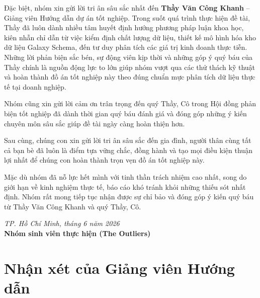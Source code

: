 \documentclass[12pt, a4paper]{report}
\begin{document}
Đặc biệt, nhóm xin gửi lời tri ân sâu sắc nhất đến \textbf{Thầy Văn Công Khanh} -- Giảng viên Hướng dẫn dự án tốt nghiệp. Trong suốt quá trình thực hiện đề tài, Thầy đã luôn dành nhiều tâm huyết định hướng phương pháp luận khoa học, kiên nhẫn chỉ dẫn từ việc kiểm định chất lượng dữ liệu, thiết kế mô hình hóa kho dữ liệu Galaxy Schema, đến tư duy phân tích các giá trị kinh doanh thực tiễn. Những lời phản biện sắc bén, sự động viên kịp thời và những góp ý quý báu của Thầy chính là nguồn động lực to lớn giúp nhóm vượt qua các thử thách kỹ thuật và hoàn thành đồ án tốt nghiệp này theo đúng chuẩn mực phân tích dữ liệu thực tế tại doanh nghiệp.

Nhóm cũng xin gửi lời cảm ơn trân trọng đến quý Thầy, Cô trong Hội đồng phản biện tốt nghiệp đã dành thời gian quý báu đánh giá và đóng góp những ý kiến chuyên môn sâu sắc giúp đề tài ngày càng hoàn thiện hơn.

Sau cùng, chúng con xin gửi lời tri ân sâu sắc đến gia đình, người thân cùng tất cả bạn bè đã luôn là điểm tựa vững chắc, đồng hành và tạo mọi điều kiện thuận lợi nhất để chúng con hoàn thành trọn vẹn đồ án tốt nghiệp này.

Mặc dù nhóm đã nỗ lực hết mình với tinh thần trách nhiệm cao nhất, song do giới hạn về kinh nghiệm thực tế, báo cáo khó tránh khỏi những thiếu sót nhất định. Nhóm rất mong tiếp tục nhận được sự chỉ bảo và đóng góp ý kiến quý báu từ Thầy Văn Công Khanh và quý Thầy, Cô.

\vspace{0.8cm}
\begin{flushright}
    \textit{TP. Hồ Chí Minh, tháng 6 năm 2026} \\
    \textbf{Nhóm sinh viên thực hiện (The Outliers)}
\end{flushright}

\chapter*{Nhận xét của Giảng viên Hướng dẫn}
\label{chap:nhanxet_gvhd}
\end{document}
